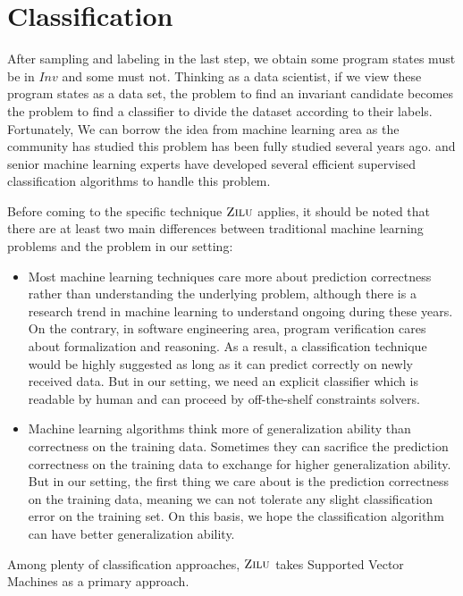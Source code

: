 
\section{Classification} %
\label{sec:classification}

After sampling and labeling in the last step, we obtain some program states must be in $Inv$ and some must not. 
Thinking as a data scientist, if we view these program states as a data set, 
the problem to find an invariant candidate becomes the problem to find a classifier to divide the dataset according to their labels.
Fortunately, We can borrow the idea from machine learning area as the community has studied this problem has been fully studied several years ago.
and senior machine learning experts have developed several efficient supervised classification algorithms to handle this problem.

Before coming to the specific technique $\textsc{Zilu}$ applies,
it should be noted that there are at least two main differences between traditional machine learning problems and the problem in our setting:
\begin{itemize}
\item Most machine learning techniques care more about prediction correctness rather than understanding the underlying problem,
although there is a research trend in machine learning to understand ongoing during these years.
On the contrary, in software engineering area, program verification cares about formalization and reasoning.
As a result, a classification technique would be highly suggested as long as it can predict correctly on newly received data.
But in our setting, we need an explicit classifier which is readable by human and can proceed by off-the-shelf constraints solvers.
\item Machine learning algorithms think more of generalization ability than correctness on the training data.
Sometimes they can sacrifice the prediction correctness on the training data to exchange for higher generalization ability.
But in our setting, the first thing we care about is the prediction  correctness on the training data,
meaning we can not tolerate any slight classification error on the training set.
On this basis, we hope the classification algorithm can have better generalization ability.
\end{itemize} 

Among plenty of classification approaches, $\textsc{Zilu}$ takes Supported Vector Machines as a primary approach.

